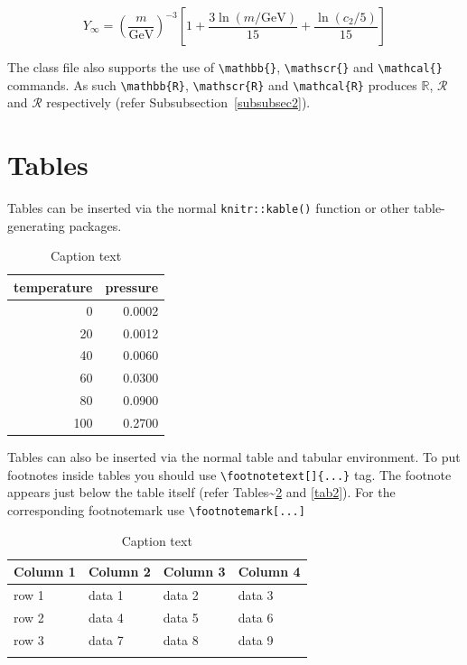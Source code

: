 \documentclass[sn-basic,lineno,pdflatex]{sn-jnl}
\theoremstyle{remark}
\theoremstyle{definition}
\begin{document}
\begin{equation}
Y_\infty = \left( \frac{m}{\textrm{GeV}} \right)^{-3}
    \left[ 1 + \frac{3 \ln(m/\textrm{GeV})}{15}
    + \frac{\ln(c_2/5)}{15} \right]
\end{equation}

The class file also supports the use of
\texttt{\textbackslash{}mathbb\{\}},
\texttt{\textbackslash{}mathscr\{\}} and
\texttt{\textbackslash{}mathcal\{\}} commands. As such
\texttt{\textbackslash{}mathbb\{R\}},
\texttt{\textbackslash{}mathscr\{R\}} and
\texttt{\textbackslash{}mathcal\{R\}} produces \(\mathbb{R}\),
\(\mathscr{R}\) and \(\mathcal{R}\) respectively (refer
Subsubsection~\ref{subsubsec2}).

\section{Tables}\label{sec5}

Tables can be inserted via the normal \texttt{knitr::kable()} function
or other table-generating packages.

\begin{table}

\caption{\label{tab:tab1}Caption text}
\centering
\begin{tabular}[t]{r|r}
\hline
temperature & pressure\\
\hline
0 & 0.0002\\
\hline
20 & 0.0012\\
\hline
40 & 0.0060\\
\hline
60 & 0.0300\\
\hline
80 & 0.0900\\
\hline
100 & 0.2700\\
\hline
\end{tabular}
\end{table}

Tables can also be inserted via the normal table and tabular
environment. To put footnotes inside tables you should use
\texttt{\textbackslash{}footnotetext{[}{]}\{...\}} tag. The footnote
appears just below the table itself (refer
Tables\textasciitilde{}\ref{tab1} and \ref{tab2}). For the corresponding
footnotemark use \texttt{\textbackslash{}footnotemark{[}...{]}}

\begin{table}[h]
\caption{Caption text}\label{tab1}%
\begin{tabular}{@{}llll@{}}
\toprule
Column 1 & Column 2  & Column 3 & Column 4\\
\midrule
row 1    & data 1   & data 2  & data 3  \\
row 2    & data 4   & data 5\footnotemark[1]  & data 6  \\
row 3    & data 7   & data 8  & data 9\footnotemark[2]  \\
\botrule
\end{tabular}
\end{table}
\end{document}
